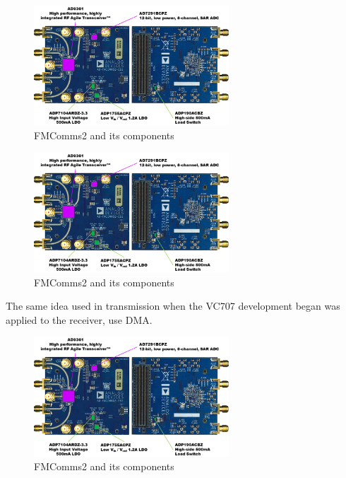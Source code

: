 \begin{figure}[htbp]
    \centering
    \includegraphics[width=0.65\textwidth]{./figures/fmcomms2_pic}
    \caption{ FMComms2 and its components
    \label{fig:fmcomm}}
\end{figure}

\begin{figure}[htbp]
    \centering
    \includegraphics[width=0.65\textwidth]{./figures/fmcomms2_pic}
    \caption{ FMComms2 and its components
    \label{fig:fmcomm}}
\end{figure}

The same idea used in transmission when the VC707 development began was applied
to the receiver, use DMA.

\begin{figure}[htbp]
    \centering
    \includegraphics[width=0.65\textwidth]{./figures/fmcomms2_pic}
    \caption{ FMComms2 and its components
    \label{fig:fmcomm}}
\end{figure}

